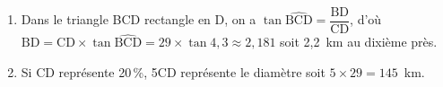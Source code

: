 \begin{enumerate}
	\begin{enumerate}
		\item %
Dans le triangle BCD rectangle en D, on a $\tan \widehat{\text{BCD}} = \dfrac{\text{BD}}{\text{CD}}$, d'où $\text{BD} = \text{CD} \times \tan \widehat{\text{BCD}} = 29 \times \tan 4,3 \approx 2,181$ soit 2,2~km au dixième près.		 
		\item %
Si CD représente 20\,\%, 5CD représente le diamètre soit $5 \times 29 = 145$~km.
	\end{enumerate} 
\end{enumerate} 

\bigskip

